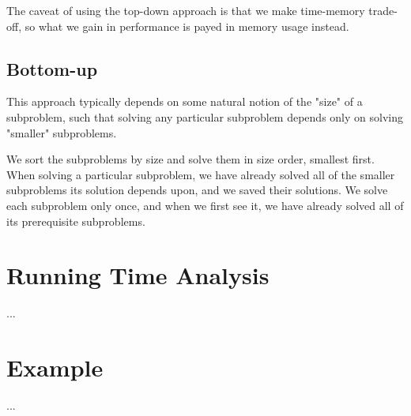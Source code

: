 The caveat of using the top-down approach is that we make time-memory
trade-off, so what we gain in performance is payed in memory usage instead.

\subsection{Bottom-up}
This approach typically depends on some natural notion of the "size" of a
subproblem, such that solving any particular subproblem depends only on
solving "smaller" subproblems.

We sort the subproblems by size and solve them in size order, smallest first.
When solving a particular subproblem, we have already solved all of the
smaller subproblems its solution depends upon, and we saved their solutions.
We solve each subproblem only once, and when we first see it, we have already
solved all of its prerequisite subproblems.

\newpage
\section{Running Time Analysis}
...

\section{Example}
...

